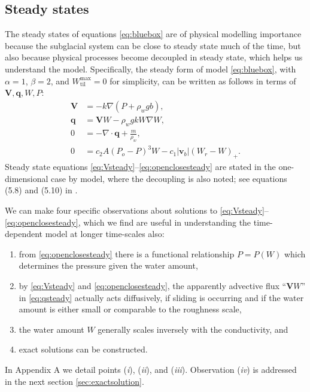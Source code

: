 \documentclass[gmd]{copernicus}   %
\newcommand{\text}{\textrm}
\newcommand\bv{\mathbf{v}}
\newcommand\bV{\mathbf{V}}
\newcommand\bq{\mathbf{q}}
\newcommand{\Div}{\nabla\cdot}
\newcommand{\grad}{\nabla}
\newcommand{\Wtilmax}{W_{\text{til}}^{\text{max}}}
\begin{document}
\subsection{Steady states}  \label{subsec:steady} The steady states of equations \eqref{eq:bluebox} are of physical modelling importance because the subglacial system can be close to steady state much of the time, but also because physical processes become decoupled in steady state, which helps us understand the model.  Specifically, the steady form of model \eqref{eq:bluebox}, with $\alpha=1$, $\beta=2$, and $\Wtilmax=0$ for simplicity, can be written as follows in terms of $\bV,\bq,W,P$:
\begin{align}
\bV &= - k \grad \left(P + \rho_w g b\right), \label{eq:Vsteady} \\
\bq &= \bV W - \rho_w g k W \grad W, \label{eq:qsteady} \\
0 &= - \Div \bq + \frac{m}{\rho_w}, \label{eq:masscontsteady} \\
0 &= c_2 A (P_o - P)^3 W - c_1 |\bv_b| (W_r - W)_+. \label{eq:openclosesteady}
\end{align}
Steady state equations \eqref{eq:Vsteady}--\eqref{eq:openclosesteady} are stated in the one-dimensional case by \cite{Schoofetal2012} model, where the decoupling is also noted; see equations (5.8) and (5.10) in \citep{Schoofetal2012}.

We can make four specific observations about solutions to \eqref{eq:Vsteady}--\eqref{eq:openclosesteady}, which we find are useful in understanding the time-dependent model at longer time-scales also:
\renewcommand{\labelenumi}{(\emph{\roman{enumi}})}
\begin{enumerate}
\item from \eqref{eq:openclosesteady} there is a functional relationship $P=P(W)$ which determines the pressure given the water amount,
\item by \eqref{eq:Vsteady} and \eqref{eq:openclosesteady}, the apparently advective flux ``$\bV W$'' in \eqref{eq:qsteady} actually acts diffusively, if sliding is occurring and if the water amount is either small or comparable to the roughness scale,
\item the water amount $W$ generally scales inversely with the conductivity, and
\item exact solutions can be constructed.
\end{enumerate}
In Appendix A we detail points (\emph{i}), (\emph{ii}), and (\emph{iii}).  Observation (\emph{iv}) is addressed in the next section \ref{sec:exactsolution}.
\end{document}
